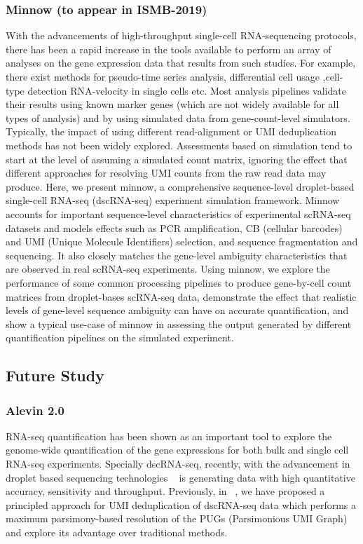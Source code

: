 \subsubsection{Minnow (to appear in ISMB-2019)}
With the advancements of high-throughput single-cell RNA-sequencing protocols, there 
has been a rapid increase in the tools available to perform an array of analyses on the 
gene expression data that results from such studies.  For example, there exist methods 
for pseudo-time series analysis, differential cell usage ,cell-type detection RNA-velocity 
in single cells etc. Most analysis pipelines validate their results using known marker 
genes (which are not widely available for all types of analysis) and by using simulated 
data from gene-count-level simulators. Typically, the impact of using different 
read-alignment or UMI deduplication methods has not been widely explored. Assessments 
based on simulation tend to start at the level of assuming a simulated count matrix, 
ignoring the effect that different approaches for resolving UMI counts from the raw read 
data may produce. Here, we present minnow, a comprehensive sequence-level droplet-based 
single-cell RNA-seq (dscRNA-seq) experiment simulation framework.  Minnow accounts for 
important sequence-level characteristics of experimental scRNA-seq datasets and models 
effects such as PCR amplification,  CB (cellular barcodes) and UMI (Unique Molecule 
Identifiers) selection, and sequence fragmentation and sequencing. It also closely matches 
the gene-level ambiguity characteristics that are observed in real scRNA-seq experiments.  
Using minnow, we explore the performance of some common processing pipelines to produce 
gene-by-cell count matrices from droplet-bases scRNA-seq data, demonstrate the effect that 
realistic levels of gene-level sequence ambiguity can have on accurate quantification, 
and show a typical use-case of minnow in assessing the output generated by different 
quantification pipelines on the simulated experiment.

\subsection{Future Study}
\subsubsection{Alevin 2.0}
RNA-seq quantification has been shown as an important tool to explore the genome-wide
quantification of the gene expressions for both bulk and single cell RNA-seq experiments. 
Specially dscRNA-seq, recently, with the advancement in droplet based sequencing technologies 
~\citet{dropseq, indrop, tenx} is generating data with high quantitative accuracy, 
sensitivity and throughput. Previously, in ~\citep{alevin}, we have proposed a
principled approach for UMI deduplication of dscRNA-seq data which performs a maximum 
parsimony-based resolution of the PUGs (Parsimonious UMI Graph) and explore its advantage over 
traditional methods. 

